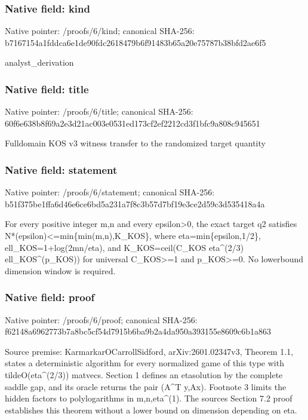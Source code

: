 \documentclass[10pt,a4paper]{article}
\begin{document}
\subsubsection{Native field: kind}


Native pointer: /proofs/6/kind; canonical SHA-256: b7167154a1fddca6e1de90fd\allowbreak{}c2618479b6f91483b65a20e7\allowbreak{}5787b38bfd2ae6f5


analyst\_derivation


\subsubsection{Native field: title}


Native pointer: /proofs/6/title; canonical SHA-256: 60f6e638b8f69a2e3d21ac00\allowbreak{}3e0531ed173cf2ef2212cd3f\allowbreak{}1bfc9a808c945651


Fulldomain KOS v3 witness transfer to the randomized target quantity


\subsubsection{Native field: statement}


Native pointer: /proofs/6/statement; canonical SHA-256: b51f375be1ffa6d46e6ce6bd\allowbreak{}5a231a7f8c3b57d7bf19e3ce\allowbreak{}2d59c3d535418a4a


For every positive integer m,n and every epsilon>0, the exact target q2 satisfies N*(epsilon)<=min\{min(m,n),K\_KOS\}, where eta=min\{epsilon,1/2\}, ell\_KOS=1+log(2mn/eta), and K\_KOS=ceil(C\_KOS eta\textasciicircum{}(2/3) ell\_KOS\textasciicircum{}(p\_KOS)) for universal C\_KOS>=1 and p\_KOS>=0. No lowerbound dimension window is required.


\subsubsection{Native field: proof}


Native pointer: /proofs/6/proof; canonical SHA-256: f62148a6962773b7a8bc5cf5\allowbreak{}4d7915b6ba9b2a4da950a393\allowbreak{}155e8609c6b1a863


Source premise: KarmarkarOCarrollSidford, arXiv:2601.02347v3, Theorem 1.1, states a deterministic algorithm for every normalized game of this type with tildeO(eta\textasciicircum{}(2/3)) matvecs. Section 1 defines an etasolution by the complete saddle gap, and its oracle returns the pair (A\textasciicircum{}T y,Ax). Footnote 3 limits the hidden factors to polylogarithms in m,n,eta\textasciicircum{}(1). The sources Section 7.2 proof establishes this theorem without a lower bound on dimension depending on eta.
\end{document}
